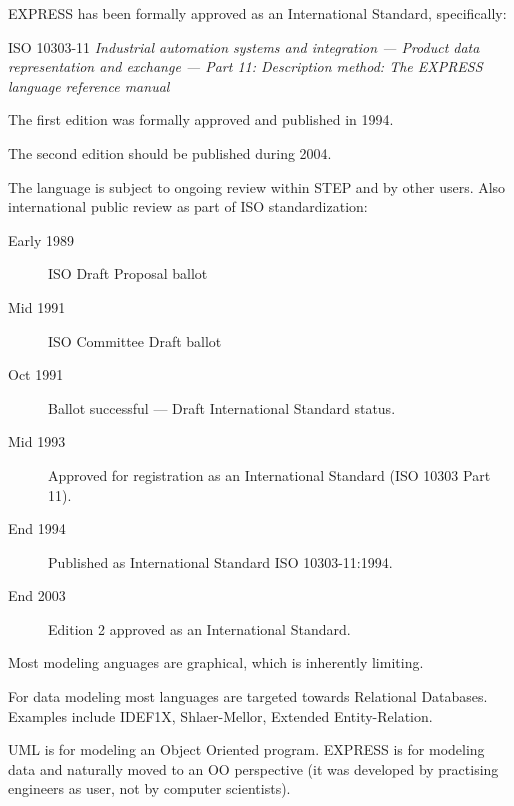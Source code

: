 \begin{remarks}
\remintro


EXPRESS has been formally approved as an International Standard,
specifically:

 ISO 10303-11 \textit{Industrial automation systems and integration ---
                      Product data representation and exchange ---
                      Part 11: Description method: The EXPRESS language
                      reference manual}

    The first edition was formally approved and published in 1994.

    The second edition should be published during 2004.


\remend
\end{remarks}


    The language is subject to ongoing review within STEP and by other users.
Also international public review as part of ISO standardization:

\begin{description}
\item[Early 1989] ISO Draft Proposal ballot %
\item[Mid 1991] ISO Committee Draft ballot %
\item[Oct 1991] Ballot successful --- Draft International Standard status.
\item[Mid 1993] Approved for registration as an International Standard
                (ISO 10303 Part 11).
\item[End 1994] Published as International Standard ISO 10303-11:1994.
\item[End 2003] Edition 2 approved as an International Standard.
\end{description}

\begin{remarks}
\remintro


 Most modeling anguages are graphical, which is inherently limiting.

For data modeling most languages are targeted towards Relational Databases.
Examples include IDEF1X, Shlaer-Mellor, Extended Entity-Relation.

   UML is for modeling an Object Oriented program. EXPRESS is for modeling
data and naturally moved to an OO perspective (it was developed by practising
engineers as user, not by computer scientists).

\remend
\end{remarks}



